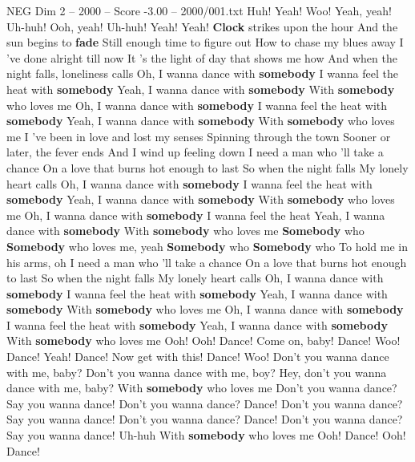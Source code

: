 \begin{textsample}{NEG Dim 2 – 2000 – Score -3.00 – 2000/001.txt}  \label{ex:f2_neg_031}
Huh!
Yeah!
Woo!
Yeah, yeah!
Uh-huh!
Ooh, yeah!
Uh-huh!
Yeah!
Yeah! \textbf{Clock} strikes upon the hour And the sun begins to \textbf{fade} Still enough time to figure out How to chase my blues away I 've done alright till now It 's the light of day that shows me how And when the night falls, loneliness calls Oh, I wanna dance with \textbf{somebody} I wanna feel the heat with \textbf{somebody} Yeah, I wanna dance with \textbf{somebody} With \textbf{somebody} who loves me Oh, I wanna dance with \textbf{somebody} I wanna feel the heat with \textbf{somebody} Yeah, I wanna dance with \textbf{somebody} With \textbf{somebody} who loves me I 've been in love and lost my senses Spinning through the town Sooner or later, the fever ends And I wind up feeling down I need a man who 'll take a chance On a love that burns hot enough to last So when the night falls My lonely heart calls Oh, I wanna dance with \textbf{somebody} I wanna feel the heat with \textbf{somebody} Yeah, I wanna dance with \textbf{somebody} With \textbf{somebody} who loves me Oh, I wanna dance with \textbf{somebody} I wanna feel the heat Yeah, I wanna dance with \textbf{somebody} With \textbf{somebody} who loves me \textbf{Somebody} who \textbf{Somebody} who loves me, yeah \textbf{Somebody} who \textbf{Somebody} who To hold me in his arms, oh I need a man who 'll take a chance On a love that burns hot enough to last So when the night falls My lonely heart calls Oh, I wanna dance with \textbf{somebody} I wanna feel the heat with \textbf{somebody} Yeah, I wanna dance with \textbf{somebody} With \textbf{somebody} who loves me Oh, I wanna dance with \textbf{somebody} I wanna feel the heat with \textbf{somebody} Yeah, I wanna dance with \textbf{somebody} With \textbf{somebody} who loves me Ooh!
Ooh!
Dance!
Come on, baby!
Dance!
Woo!
Dance!
Yeah!
Dance!
Now get with this!
Dance!
Woo!
Don't you wanna dance with me, baby?
Don't you wanna dance with me, boy?
Hey, don't you wanna dance with me, baby?
With \textbf{somebody} who loves me Don't you wanna dance?
Say you wanna dance!
Don't you wanna dance?
Dance!
Don't you wanna dance?
Say you wanna dance!
Don't you wanna dance?
Dance!
Don't you wanna dance?
Say you wanna dance!
Uh-huh With \textbf{somebody} who loves me Ooh!
Dance!
Ooh!
Dance!

\end{textsample}
